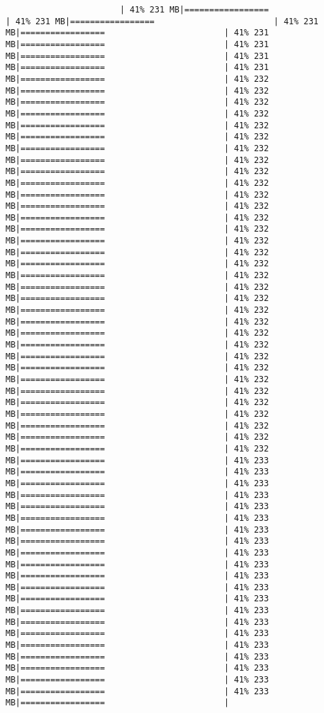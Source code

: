 \documentclass[
]{article}
\begin{document}
\begin{verbatim}
                       | 41% 231 MB|=================                        | 41% 231 MB|=================                        | 41% 231 MB|=================                        | 41% 231 MB|=================                        | 41% 231 MB|=================                        | 41% 231 MB|=================                        | 41% 231 MB|=================                        | 41% 232 MB|=================                        | 41% 232 MB|=================                        | 41% 232 MB|=================                        | 41% 232 MB|=================                        | 41% 232 MB|=================                        | 41% 232 MB|=================                        | 41% 232 MB|=================                        | 41% 232 MB|=================                        | 41% 232 MB|=================                        | 41% 232 MB|=================                        | 41% 232 MB|=================                        | 41% 232 MB|=================                        | 41% 232 MB|=================                        | 41% 232 MB|=================                        | 41% 232 MB|=================                        | 41% 232 MB|=================                        | 41% 232 MB|=================                        | 41% 232 MB|=================                        | 41% 232 MB|=================                        | 41% 232 MB|=================                        | 41% 232 MB|=================                        | 41% 232 MB|=================                        | 41% 232 MB|=================                        | 41% 232 MB|=================                        | 41% 232 MB|=================                        | 41% 232 MB|=================                        | 41% 232 MB|=================                        | 41% 232 MB|=================                        | 41% 232 MB|=================                        | 41% 232 MB|=================                        | 41% 232 MB|=================                        | 41% 232 MB|=================                        | 41% 232 MB|=================                        | 41% 233 MB|=================                        | 41% 233 MB|=================                        | 41% 233 MB|=================                        | 41% 233 MB|=================                        | 41% 233 MB|=================                        | 41% 233 MB|=================                        | 41% 233 MB|=================                        | 41% 233 MB|=================                        | 41% 233 MB|=================                        | 41% 233 MB|=================                        | 41% 233 MB|=================                        | 41% 233 MB|=================                        | 41% 233 MB|=================                        | 41% 233 MB|=================                        | 41% 233 MB|=================                        | 41% 233 MB|=================                        | 41% 233 MB|=================                        | 41% 233 MB|=================                        | 41% 233 MB|=================                        | 41% 233 MB|=================                        | 41% 233 MB|=================                        | 
\end{verbatim}
\end{document}
